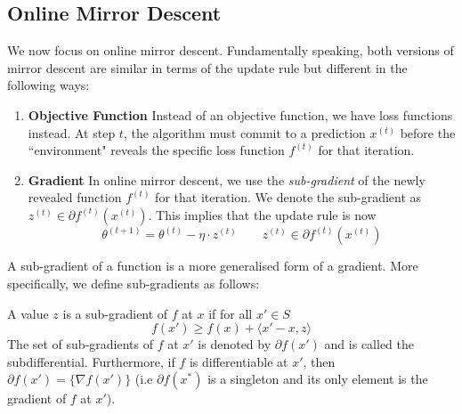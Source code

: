 \subsection{Online Mirror Descent}
We now focus on online mirror descent. Fundamentally speaking, both versions of mirror descent are similar in terms of the update rule but different in the following ways:\begin{enumerate}
    \item \textbf{Objective Function} Instead of an objective function, we have loss functions instead. At step $t$, the algorithm must commit to a prediction $x^{(t)}$ before the ``environment" reveals the specific loss function $f^{(t)}$ for that iteration.
    \item \textbf{Gradient} In online mirror descent, we use the \textit{sub-gradient} of the newly revealed function $f^{(t)}$ for that iteration. We denote the sub-gradient as $z^{(t)} \in \partial f^{(t)}(x^{(t)})$. This implies that the update rule is now \begin{equation}
        \theta^{(t+1)}=  \theta^{(t)} - \eta \cdot z^{(t)}\qquad z^{(t)} \in \partial f^{(t)}(x^{(t)})
    \end{equation}
\end{enumerate}
A sub-gradient of a function is a more generalised form of a gradient. More specifically, we define sub-gradients as follows:\begin{define}\label{defn:subgradient}
    A value $z$ is a sub-gradient of $f$ at $x$ if for all $x' \in S$\begin{equation}
        f(x') \geq f(x) + \langle x' - x, z\rangle
    \end{equation}
    The set of sub-gradients of $f$ at $x'$ is denoted by $\partial f(x')$ and is called the subdifferential. Furthermore, if $f$ is differentiable at $x'$, then $\partial f(x') = \{\nabla f(x')\}$ (i.e $\partial f(x^*)$ is a singleton and its only element is the gradient of $f$ at $x'$).
\end{define}

